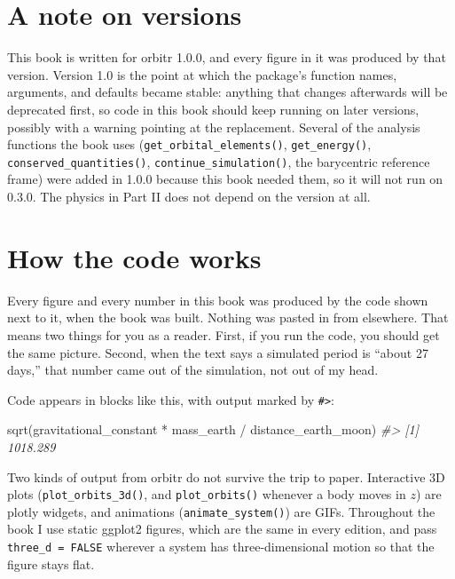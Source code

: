 \documentclass[
  10.5pt,
  letterpaper,
]{scrbook}
\newenvironment{Shaded}{\begin{snugshade}}{\end{snugshade}}
\newcommand{\CommentTok}[1]{\textcolor[rgb]{0.00,0.00,0.00}{\textit{#1}}}
\newcommand{\FunctionTok}[1]{\textcolor[rgb]{0.00,0.00,0.00}{#1}}
\newcommand{\NormalTok}[1]{\textcolor[rgb]{0.00,0.00,0.00}{#1}}
\newcommand{\SpecialCharTok}[1]{\textcolor[rgb]{0.00,0.00,0.00}{#1}}
\theoremstyle{definition}
\theoremstyle{plain}
\theoremstyle{remark}
\begin{document}
\section*{A note on versions}\label{a-note-on-versions}


This book is written for orbitr 1.0.0, and every figure in it was
produced by that version. Version 1.0 is the point at which the
package's function names, arguments, and defaults became stable:
anything that changes afterwards will be deprecated first, so code in
this book should keep running on later versions, possibly with a warning
pointing at the replacement. Several of the analysis functions the book
uses (\texttt{get\_orbital\_elements()}, \texttt{get\_energy()},
\texttt{conserved\_quantities()}, \texttt{continue\_simulation()}, the
barycentric reference frame) were added in 1.0.0 because this book
needed them, so it will not run on 0.3.0. The physics in Part II does
not depend on the version at all.

\section*{How the code works}\label{how-the-code-works}


Every figure and every number in this book was produced by the code
shown next to it, when the book was built. Nothing was pasted in from
elsewhere. That means two things for you as a reader. First, if you run
the code, you should get the same picture. Second, when the text says a
simulated period is ``about 27 days,'' that number came out of the
simulation, not out of my head.

Code appears in blocks like this, with output marked by
\texttt{\#\textgreater{}}:

\begin{Shaded}
\begin{Highlighting}[]
\FunctionTok{sqrt}\NormalTok{(gravitational\_constant }\SpecialCharTok{*}\NormalTok{ mass\_earth }\SpecialCharTok{/}\NormalTok{ distance\_earth\_moon)}
\CommentTok{\#\textgreater{} [1] 1018.289}
\end{Highlighting}
\end{Shaded}

Two kinds of output from orbitr do not survive the trip to paper.
Interactive 3D plots (\texttt{plot\_orbits\_3d()}, and
\texttt{plot\_orbits()} whenever a body moves in \(z\)) are plotly
widgets, and animations (\texttt{animate\_system()}) are GIFs.
Throughout the book I use static ggplot2 figures, which are the same in
every edition, and pass \texttt{three\_d\ =\ FALSE} wherever a system
has three-dimensional motion so that the figure stays flat.
\end{document}
